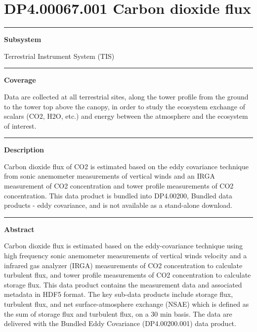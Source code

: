 \documentclass[]{article}
\begin{document}
\section{DP4.00067.001 Carbon dioxide
flux}\label{dp4.00067.001-carbon-dioxide-flux}

\begin{center}\rule{0.5\linewidth}{\linethickness}\end{center}

\textbf{Subsystem}

Terrestrial Instrument System (TIS)

\begin{center}\rule{0.5\linewidth}{\linethickness}\end{center}

\textbf{Coverage}

Data are collected at all terrestrial sites, along the tower profile
from the ground to the tower top above the canopy, in order to study the
ecosystem exchange of scalars (CO2, H2O, etc.) and energy between the
atmosphere and the ecosystem of interest.

\begin{center}\rule{0.5\linewidth}{\linethickness}\end{center}

\textbf{Description}

Carbon dioxide flux of CO2 is estimated based on the eddy covariance
technique from sonic anemometer measurements of vertical winds and an
IRGA measurement of CO2 concentration and tower profile measurements of
CO2 concentration. This data product is bundled into DP4.00200, Bundled
data products - eddy covariance, and is not available as a stand-alone
download.

\begin{center}\rule{0.5\linewidth}{\linethickness}\end{center}

\textbf{Abstract}

Carbon dioxide flux is estimated based on the eddy-covariance technique
using high frequency sonic anemometer measurements of vertical winds
velocity and a infrared gas analyzer (IRGA) measurements of CO2
concentration to calculate turbulent flux, and tower profile
measurements of CO2 concentration to calculate storage flux. This data
product contains the measurement data and associated metadata in HDF5
format. The key sub-data products include storage flux, turbulent flux,
and net surface-atmosphere exchange (NSAE) which is defined as the sum
of storage flux and turbulent flux, on a 30 min basis. The data are
delivered with the Bundled Eddy Covariance (DP4.00200.001) data product.
\end{document}
